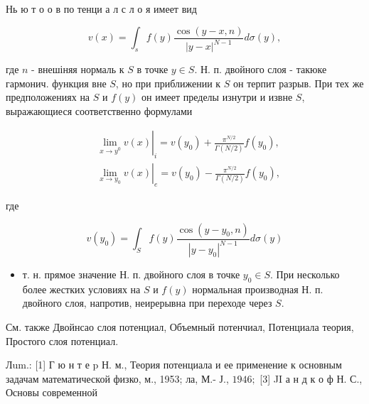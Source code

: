 \documentclass[10pt]{article}
\begin{document}
Нь ю т о о в по тенци а л с л о я имеет вид



\[

v(x)=\int_{s} f(y) \frac{\cos (y-x, n)}{|y-x|^{N-1}} d \sigma(y),

\]



где $n$ - внешіняя нормаль к $S$ в точке $y \in S$. Н. п. двойного слоя - такюке гармонич. функция вне $S$, но при приближении к $S$ он терпит разрыв. При тех же предположениях на $S$ и $f(y)$ он имеет пределы изнутри и извне $S$, выражающиеся соответственно формулами



\[

\begin{aligned}

& \left.\lim _{x \rightarrow y^{0}} v(x)\right|_{i}=v\left(y_{0}\right)+\frac{\pi^{N / 2}}{\Gamma(N / 2)} f\left(y_{0}\right), \\

& \left.\lim _{x \rightarrow y_{0}} v(x)\right|_{e}=v\left(y_{0}\right)-\frac{\pi^{N / 2}}{\Gamma(N / 2)} f\left(y_{0}\right),

\end{aligned}

\]



где



\[

v\left(y_{0}\right)=\int_{S} f(y) \frac{\cos \left(y-y_{0}, n\right)}{\left|y-y_{0}\right|^{N-1}} d \sigma(y)

\]



\begin{itemize}

  \item т. н. прямое значение Н. п. двойного слоя в точке $y_{0} \in S$. При несколько более жестких условиях на $S$ и $f(y)$ нормальная производная Н. п. двойного слоя, напротив, неирерывна при переходе через $S$.

\end{itemize}



См. также Двойнсао слоя потенциал, Объемный потенчиал, Потенциала теория, Простого слоя потенциал.



Лum.: [1] Г ю н т е p Н. м., Теория потенциала и ее применение к основным задачам математической физко, м., 1953; ла, М.- Ј., $1946 ;$ [3] JI а н д к о ф Н. С., Основы современной
\end{document}
